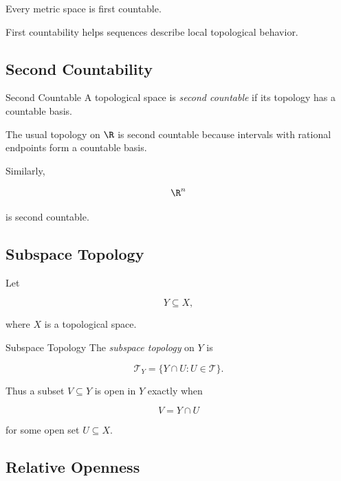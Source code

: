 Every metric space is first countable.

First countability helps sequences describe local topological behavior.

\subsection{Second Countability}
\label{subsec:second-countability}

\begin{definitionbox}{Second Countable}
A topological space is \emph{second countable} if its topology has a
countable basis.
\end{definitionbox}

The usual topology on \(\R\) is second countable because intervals with
rational endpoints form a countable basis.

Similarly,

\[
\R^n
\]

is second countable.

\subsection{Subspace Topology}
\label{subsec:subspace-topology}

Let

\[
Y\subseteq X,
\]

where \(X\) is a topological space.

\begin{definitionbox}{Subspace Topology}
The \emph{subspace topology} on \(Y\) is

\[
\boxed{
\mathcal{T}_Y
=
\{
Y\cap U:
U\in\mathcal{T}
\}.
}
\]
\end{definitionbox}

Thus a subset \(V\subseteq Y\) is open in \(Y\) exactly when

\[
\boxed{
V=Y\cap U
}
\]

for some open set \(U\subseteq X\).

\subsection{Relative Openness}
\label{subsec:relative-openness}

